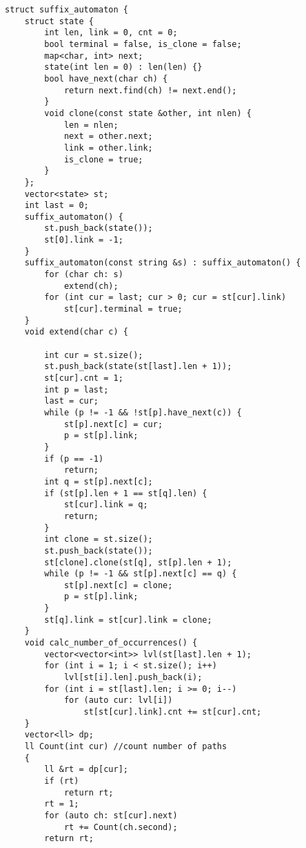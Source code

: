 {\begin{lstlisting}[style=cpp]
struct suffix_automaton {  
    struct state {  
        int len, link = 0, cnt = 0;  
        bool terminal = false, is_clone = false;  
        map<char, int> next;  
        state(int len = 0) : len(len) {}  
        bool have_next(char ch) {  
            return next.find(ch) != next.end();  
        }  
        void clone(const state &other, int nlen) {  
            len = nlen;  
            next = other.next;  
            link = other.link;  
            is_clone = true;  
        }  
    };  
    vector<state> st;  
    int last = 0;  
    suffix_automaton() {  
        st.push_back(state());  
        st[0].link = -1;  
    }  
    suffix_automaton(const string &s) : suffix_automaton() {  
        for (char ch: s)  
            extend(ch);  
        for (int cur = last; cur > 0; cur = st[cur].link)  
            st[cur].terminal = true;  
    }  
    void extend(char c) {  
          
        int cur = st.size();  
        st.push_back(state(st[last].len + 1));  
        st[cur].cnt = 1;  
        int p = last;  
        last = cur;  
        while (p != -1 && !st[p].have_next(c)) {  
            st[p].next[c] = cur;  
            p = st[p].link;  
        }  
        if (p == -1)  
            return;  
        int q = st[p].next[c];  
        if (st[p].len + 1 == st[q].len) {  
            st[cur].link = q;  
            return;  
        }  
        int clone = st.size();  
        st.push_back(state());  
        st[clone].clone(st[q], st[p].len + 1);  
        while (p != -1 && st[p].next[c] == q) {  
            st[p].next[c] = clone;  
            p = st[p].link;  
        }  
        st[q].link = st[cur].link = clone;  
    }  
    void calc_number_of_occurrences() {  
        vector<vector<int>> lvl(st[last].len + 1);  
        for (int i = 1; i < st.size(); i++)  
            lvl[st[i].len].push_back(i);  
        for (int i = st[last].len; i >= 0; i--)  
            for (auto cur: lvl[i])  
                st[st[cur].link].cnt += st[cur].cnt;  
    }  
    vector<ll> dp;  
    ll Count(int cur) //count number of paths  
    {  
        ll &rt = dp[cur];  
        if (rt)  
            return rt;  
        rt = 1;  
        for (auto ch: st[cur].next)  
            rt += Count(ch.second);  
        return rt;  
          

\end{lstlisting}}
